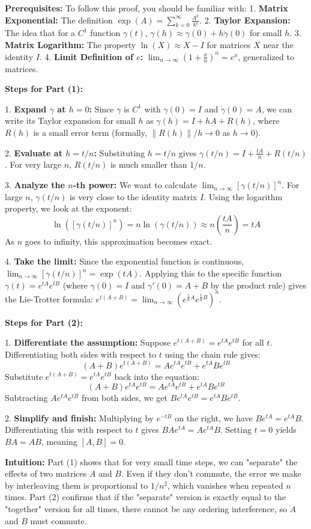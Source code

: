 \begin{solution}
\textbf{Prerequisites:}
To follow this proof, you should be familiar with:
1. \textbf{Matrix Exponential:} The definition $\exp(A) = \sum_{k=0}^\infty \frac{A^k}{k!}$.
2. \textbf{Taylor Expansion:} The idea that for a $C^1$ function $\gamma(t)$, $\gamma(h) \approx \gamma(0) + h\dot{\gamma}(0)$ for small $h$.
3. \textbf{Matrix Logarithm:} The property $\ln(X) \approx X - I$ for matrices $X$ near the identity $I$.
4. \textbf{Limit Definition of $e$:} $\lim_{n \to \infty} (1 + \frac{x}{n})^n = e^x$, generalized to matrices.

\textbf{Steps for Part (1):}

1. \textbf{Expand $\gamma$ at $h=0$:}
Since $\gamma$ is $C^1$ with $\gamma(0)=I$ and $\dot{\gamma}(0)=A$, we can write its Taylor expansion for small $h$ as $\gamma(h) = I + hA + R(h)$, where $R(h)$ is a small error term (formally, $\|R(h)\|/h \to 0$ as $h \to 0$).

2. \textbf{Evaluate at $h = t/n$:}
Substituting $h = t/n$ gives $\gamma(t/n) = I + \frac{tA}{n} + R(t/n)$. For very large $n$, $R(t/n)$ is much smaller than $1/n$.

3. \textbf{Analyze the $n$-th power:}
We want to calculate $\lim_{n \to \infty} [\gamma(t/n)]^n$. For large $n$, $\gamma(t/n)$ is very close to the identity matrix $I$. Using the logarithm property, we look at the exponent:
\[ \ln([\gamma(t/n)]^n) = n \ln(\gamma(t/n)) \approx n \left( \frac{tA}{n} \right) = tA \]
As $n$ goes to infinity, this approximation becomes exact.

4. \textbf{Take the limit:}
Since the exponential function is continuous, $\lim_{n \to \infty} [\gamma(t/n)]^n = \exp(tA)$. Applying this to the specific function $\gamma(t) = e^{tA}e^{tB}$ (where $\gamma(0)=I$ and $\gamma'(0)=A+B$ by the product rule) gives the Lie-Trotter formula: $e^{t(A+B)} = \lim_{n\to\infty}(e^{\frac{t}{n}A}e^{\frac{t}{n}B})^n$.

\textbf{Steps for Part (2):}

1. \textbf{Differentiate the assumption:}
Suppose $e^{t(A+B)} = e^{tA}e^{tB}$ for all $t$. Differentiating both sides with respect to $t$ using the chain rule gives:
\[ (A+B)e^{t(A+B)} = Ae^{tA}e^{tB} + e^{tA}Be^{tB} \]
Substitute $e^{t(A+B)} = e^{tA}e^{tB}$ back into the equation:
\[ (A+B)e^{tA}e^{tB} = Ae^{tA}e^{tB} + e^{tA}Be^{tB} \]
Subtracting $Ae^{tA}e^{tB}$ from both sides, we get $Be^{tA}e^{tB} = e^{tA}Be^{tB}$.

2. \textbf{Simplify and finish:}
Multiplying by $e^{-tB}$ on the right, we have $Be^{tA} = e^{tA}B$. Differentiating this with respect to $t$ gives $BA e^{tA} = A e^{tA} B$. Setting $t=0$ yields $BA = AB$, meaning $[A,B]=0$.

\textbf{Intuition:}
Part (1) shows that for very small time steps, we can "separate" the effects of two matrices $A$ and $B$. Even if they don't commute, the error we make by interleaving them is proportional to $1/n^2$, which vanishes when repeated $n$ times. Part (2) confirms that if the "separate" version is exactly equal to the "together" version for all times, there cannot be any ordering interference, so $A$ and $B$ must commute.
\end{solution}

